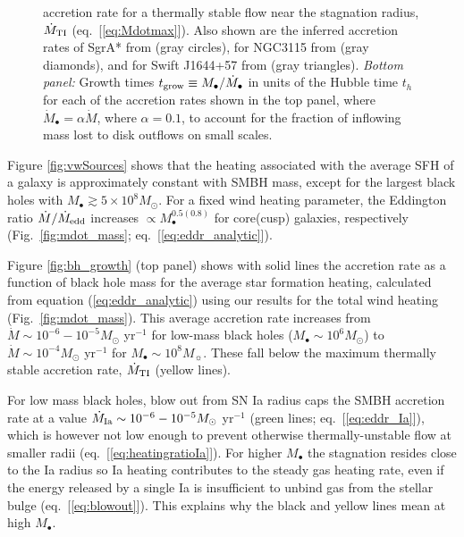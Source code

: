 \documentclass[usenatbib,fleqn]{mn2e}
\newcommand{\Mbh}[1][]{M_{\bullet#1}}
\renewcommand{\th}{t_h}
\begin{document}
\begin{figure}
{  accretion rate for a thermally stable flow near the stagnation radius, $\dot{M}_{\rm TI}$ (eq.~[\ref{eq:Mdotmax}]).  Also shown are the inferred accretion rates of SgrA* from \citet{Quataert:2004a} (gray circles), for
  NGC3115 from \citet{ShcherbakovWong+:2014a} (gray diamonds), and for Swift J1644+57 from \citet{BergerZauderer+:2012a} (gray
  triangles).  {\it Bottom panel:} Growth times $t_{\rm grow} \equiv \Mbh/\dot{M}_{\bullet}$ in units of
  the Hubble time $\th$ for each of the accretion rates shown in the
  top panel, where $\dot{M}_{\bullet} = \alpha\dot{M}$, where $\alpha = 0.1$, to account for the fraction of inflowing mass lost to disk outflows on small scales.}
\end{figure}

Figure \ref{fig:vwSources} shows that the heating associated with the
average SFH of a galaxy is approximately constant
with SMBH mass, except for the largest black holes with $M_{\bullet}
\gtrsim 5\times 10^{8}M_{\odot}$.  For a fixed wind heating parameter,
the Eddington ratio $\dot{M}/\dot{M}_{\rm edd}$ increases $\propto
M_{\bullet}^{0.5(0.8)}$ for core(cusp) galaxies, respectively
(Fig.~\ref{fig:mdot_mass}; eq.~[\ref{eq:eddr_analytic}]).

Figure \ref{fig:bh_growth} (top panel) shows with solid lines the
accretion rate as a function of black hole mass for the average star
formation heating, calculated from equation (\ref{eq:eddr_analytic})
using our results for the total wind heating
(Fig.~\ref{fig:mdot_mass}).  This average accretion rate increases
from $\dot{M} \sim 10^{-6}-10^{-5}M_{\odot}$ yr$^{-1}$ for low-mass
black holes ($M_{\bullet} \sim 10^{6}M_{\odot}$) to $\dot{M} \sim
10^{-4}M_{\odot}$ yr$^{-1}$ for $M_{\bullet} \sim 10^{8}M_{\sun}$.
These fall below the maximum thermally stable accretion rate,
$\dot{M}_{\rm TI}$ (yellow lines).


For low mass black holes, blow out from SN Ia radius caps the SMBH
accretion rate at a value $\dot{M}_{\rm Ia} \sim
10^{-6}-10^{-5}M_{\odot}$ yr$^{-1}$ (green lines;
eq.~[\ref{eq:eddr_Ia}]), which is however not low enough to prevent
otherwise thermally-unstable flow at smaller radii (eq.~[\ref{eq:heatingratioIa}]).  For higher
$M_{\bullet}$ the stagnation resides close to the Ia radius so Ia
heating contributes to the steady gas heating rate, even if the energy
released by a single Ia is insufficient to unbind gas from the stellar
bulge (eq.~[\ref{eq:blowout}]).  This explains why the black and yellow lines mean at high $M_{\bullet}$.
\end{document}
